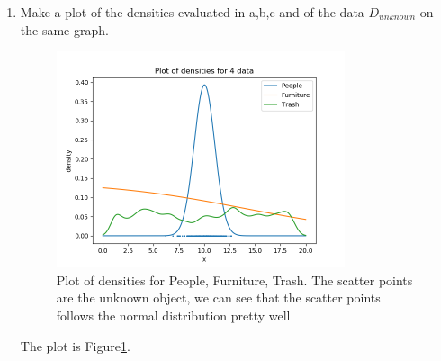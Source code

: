 \documentclass[preprint,12pt]{elsarticle}
\begin{document}
\begin{enumerate}[label=\alph*]
        \begin{lstlisting}
# d). hw4-unknown.dat
f = open(dir+r'\hw4-unknown.dat')

x_test = [float(xx) for xx in f.readline().split(' ')]

classes = ['People', 'Furniture', 'Trash']
score = [0]*len(classes)
score[classes.index('People')] = sum(np.log(norm.pdf(x_test, mu, sigma)))
score[classes.index('Furniture')] = sum([np.log(a_ML*np.exp(-a_ML*xi-b_ML)/\
                                        (1+np.exp(-a_ML*xi-b_ML))) for xi in x_test])
for xi in x_test:
    score[classes.index('Trash')] += np.log(1/(n*h)*sum(1/math.sqrt(2*math.pi)*\
                                    np.exp([-(xi-xci)**2/(2*(h**2)) for xci in xc])))
    
print('The Log-Likelihood Score for People is ', score[classes.index('People')])
print('The Log-Likelihood Score for Furniture is ', score[classes.index('Furniture')])
print('The Log-Likelihood Score for Trash is ', score[classes.index('Trash')])
print('The Best Score is ', classes[score.index(max(score))], ' with ', max(score))
        \end{lstlisting}
        \begin{spverbatim}
The Log-Likelihood Score for People is  -485.12788083461237
The Log-Likelihood Score for Furniture is  -791.6883358525606
The Log-Likelihood Score for Trash is  -1018.3103894355676
The Best Score is  Furniture  with  -485.12788083461237s
        \end{spverbatim}

        Therefore, the unknown object should be people.

        \item Make a plot of the densities evaluated in a,b,c and of the data
        $D_{unknown}$ on the same graph.

        \begin{figure}[htbp!]
            \center
            \includegraphics[width = 0.8\textwidth]{3.png}
            \caption{Plot of densities for People, Furniture, Trash.
            The scatter points are the unknown object, we can see
            that the scatter points follows the normal distribution
            pretty well}
            \label{fig:2}
        \end{figure}

        The plot is Figure\ref{fig:2}.
    \end{enumerate}
\end{document}
